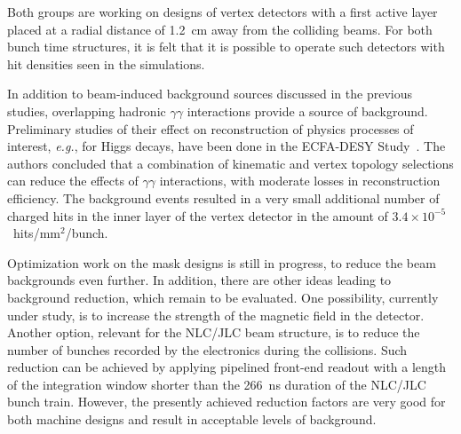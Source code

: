 Both groups are working on designs of vertex
detectors with a first active layer placed at a radial distance of
1.2~cm away from the colliding beams.
For both bunch time structures, it is felt
that it is possible to operate such detectors with hit densities
seen in the simulations.

In addition to beam-induced background sources discussed in the 
previous studies, overlapping hadronic $\gamma\gamma$ interactions 
provide a source of background.
Preliminary studies of their effect on reconstruction of 
physics processes of interest, {\it e.g.}, for Higgs decays, 
have been done in the ECFA-DESY Study~\cite{ref-MB_ggbkg}. 
The authors concluded that a combination
of kinematic and vertex topology selections can reduce the effects of 
$\gamma\gamma$ interactions, with moderate losses in reconstruction 
efficiency.  The background events resulted in a very small 
additional number of charged hits in the inner layer of the vertex 
detector in the amount of $3.4 \times 10^{-5}$~hits/mm$^2$/bunch.

Optimization work on the mask designs is still in progress, to reduce
the beam backgrounds even further.
In addition, there are other ideas leading to background reduction,
which remain to be evaluated.
One possibility, currently under study, is to increase the strength of
the magnetic field in the detector.
Another option, relevant for the NLC/JLC beam structure, is to
reduce the number of bunches recorded by the electronics during the
collisions.
Such reduction can be achieved by applying pipelined front-end readout 
with a length of the integration window shorter than the 266~ns 
duration of the NLC/JLC bunch train.
However, the presently achieved reduction factors are very good for 
both machine designs and result in acceptable levels of background.


